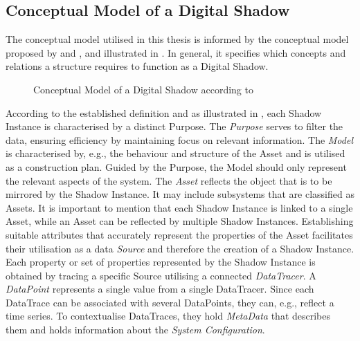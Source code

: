     \subsection{Conceptual Model of a Digital Shadow} \label{subsec:DSConceptualModel}
    The conceptual model utilised in this thesis is informed by the conceptual model proposed by \Textcite{DSConceptualModelElsevier} and \Textcite{DSConceptualModelSpringer}, and illustrated in . In general, it specifies which concepts and relations a structure requires to function as a Digital Shadow.

    \begin{figure}[h]
        \centering
        
        \caption[Conceptual Model of a Digital Shadow]{Conceptual Model of a Digital Shadow according to \cite{DSConceptualModelElsevier}\cite{DSConceptualModelSpringer}} \label{fig:tikz:DSconceptualModel}
    \end{figure}

    According to the established definition and as illustrated in , each Shadow Instance is characterised by a distinct Purpose. The \emph{Purpose} serves to filter the data, ensuring efficiency by maintaining focus on relevant information.
    The \emph{Model} is characterised by, e.g., the behaviour and structure of the Asset and is utilised as a construction plan. Guided by the Purpose, the Model should only represent the relevant aspects of the system.
    The \emph{Asset} reflects the object that is to be mirrored by the Shadow Instance. It may include subsystems that are classified as Assets. It is important to mention that each Shadow Instance is linked to a single Asset, while an Asset can be reflected by multiple Shadow Instances.
    Establishing suitable attributes that accurately represent the properties of the Asset facilitates their utilisation as a data \emph{Source} and therefore the creation of a Shadow Instance.
    Each property or set of properties represented by the Shadow Instance is obtained by tracing a specific Source utilising a connected \emph{DataTracer}.
    A \emph{DataPoint} represents a single value from a single DataTracer. Since each DataTrace can be associated with several DataPoints, they can, e.g., reflect a time series.
    To contextualise DataTraces, they hold \emph{MetaData} that describes them and holds information about the \emph{System Configuration}. \cite[p.~273ff]{DSConceptualModelSpringer}

